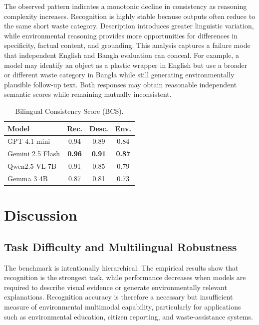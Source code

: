 \documentclass{article}
\begin{document}
The observed pattern indicates a monotonic decline in consistency as reasoning complexity increases. Recognition is highly stable because outputs often reduce to the same short waste category. Description introduces greater linguistic variation, while environmental reasoning provides more opportunities for differences in specificity, factual content, and grounding. This analysis captures a failure mode that independent English and Bangla evaluation can conceal. For example, a model may identify an object as a plastic wrapper in English but use a broader or different waste category in Bangla while still generating environmentally plausible follow-up text. Both responses may obtain reasonable independent semantic scores while remaining mutually inconsistent.
\begin{table}[htb]
\centering
\caption{Bilingual Consistency Score (BCS). }
\label{tab:bcs_results}
\begin{tabular}{lccc}
\toprule
\textbf{Model}
&
\textbf{Rec.}
&
\textbf{Desc.}
&
\textbf{Env.} \\
\midrule
GPT-4.1 mini
& 0.94
& 0.89
& 0.84 \\

Gemini 2.5 Flash
& \textbf{0.96}
& \textbf{0.91}
& \textbf{0.87} \\

Qwen2.5-VL-7B
& 0.91
& 0.85
& 0.79 \\

Gemma 3 4B
& 0.87
& 0.81
& 0.73 \\
\bottomrule
\end{tabular}
\end{table}


%
\section{Discussion}
\label{sec:discussion}
%

\subsection{Task Difficulty and Multilingual Robustness}
\label{subsec:task_multilingual_discussion}

The benchmark is intentionally hierarchical. The empirical results show that recognition is the strongest task, while performance decreases when models are required to describe visual evidence or generate environmentally relevant explanations. Recognition accuracy is therefore a necessary but insufficient measure of environmental multimodal capability, particularly for applications such as environmental education, citizen reporting, and waste-assistance systems.
\end{document}
